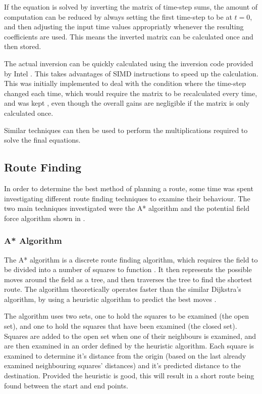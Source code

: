 \documentclass[10pt]{article}
\begin{document}
If the equation is solved by inverting the matrix of time-step sums, the amount
of computation can be reduced by always setting the first time-step to be at
$t=0$, and then adjusting the input time values appropriatly whenever the
resulting coefficients are used.  This means the inverted matrix can be
calculated once and then stored.

The actual inversion can be quickly calculated using the inversion code provided
by Intel \cite{intelMatrixInverse}.  This takes advantages of SIMD
instructions to speed up the calculation.  This was initially implemented to
deal with the condition where the time-step changed each time, which would
require the matrix to be recalculated every time, and was kept , even though the
overall gains are negligible if the matrix is only calculated once.

Similar techniques can then be used to perform the multiplications required to
solve the final equations.

\subsection{Route Finding}
In order to determine the best method of planning a route, some time was spent
investigating different route finding techniques to examine their behaviour. 
The two main techniques investigated were the A* algorithm and the potential
field force algorithm shown in \cite{intelligentAlgorithmPathPlanning}.

\subsubsection{A* Algorithm}

The A* algorithm is a discrete route finding algorithm, which requires the field
to be divided into a number of squares to function \cite{aiModernApproach}.  It
then represents the possible moves around the field as a tree, and then
traverses the tree to find the shortest route.  The algorithm theoretically
operates faster than the similar Dijkstra's algorithm, by using a heuristic
algorithm to predict the best moves \cite{wikipediaAStar}.

The algorithm uses two sets, one to hold the squares to be examined (the open
set), and one to hold the squares that have been examined (the closed set).
Squares are added to the open set when one of their neighbours is examined, and
are then examined in an order defined by the heuristic algorithm.  Each square
is examined to determine it's distance from the origin (based on the last
already examined neighbouring squares' distances) and it's predicted distance to
the destination. Provided the heuristic is good, this will result in a short
route being found between the start and end points.
\end{document}
